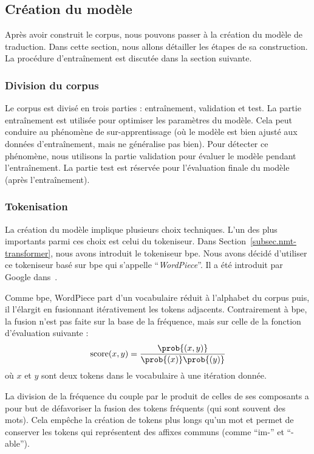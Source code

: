 \subsection{Création du modèle}

Après avoir construit le corpus, nous pouvons passer à la création du modèle de traduction.
Dans cette section, nous allons détailler les étapes de sa construction.
La procédure d'entraînement est discutée dans la section suivante.

\subsubsection{Division du corpus}

Le corpus est divisé en trois parties : entraînement, validation et test.
La partie entraînement est utilisée pour optimiser les paramètres du modèle.
Cela peut conduire au phénomène de sur-apprentissage 
(où le modèle est bien ajusté aux données d'entraînement, mais ne généralise pas bien).
Pour détecter ce phénomène, nous utilisons la partie validation pour évaluer le modèle pendant l'entraînement.
La partie test est réservée pour l'évaluation finale du modèle (après l'entraînement).

\subsubsection{Tokenisation}

La création du modèle implique plusieurs choix techniques.
L'un des plus importants parmi ces choix est celui du tokeniseur.
Dans Section~\ref{subsec.nmt-transformer}, 
nous avons introduit le tokeniseur \gls{bpe}.
Nous avons décidé d'utiliser ce tokeniseur basé sur \gls{bpe} qui s'appelle ``\emph{WordPiece}''.
Il a été introduit par Google dans~\cite{Devlin_Chang_Lee_Touta11a_2019}.

Comme \gls{bpe}, WordPiece part d'un vocabulaire réduit à l'alphabet du corpus
puis, il l'élargit en fusionnant itérativement les tokens adjacents.
Contrairement à \gls{bpe}, la fusion n'est pas faite sur la base de la fréquence,
mais sur celle de la fonction d'évaluation suivante :
\begin{equation}
    \label{eq.wp-score}
    \mathrm{score}(x, y) = \frac{\prob{(x, y)}}{\prob{(x)} \prob{(y)}}
\end{equation}
où \(x\) et \(y\) sont deux tokens dans le vocabulaire à une itération donnée.

La division de la fréquence du couple par le produit de celles de ses composants
a pour but de défavoriser la fusion des tokens fréquents (qui sont souvent des mots).
Cela empêche la création de tokens plus longs qu'un mot et permet de conserver les tokens
qui représentent des affixes communs (comme ``im-'' et ``-able'').

